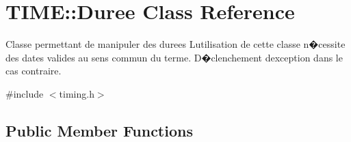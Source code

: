 \hypertarget{class_t_i_m_e_1_1_duree}{}\section{T\+I\+M\+E\+:\+:Duree Class Reference}
\label{class_t_i_m_e_1_1_duree}


Classe permettant de manipuler des durees L\textquotesingle{}utilisation de cette classe n�cessite des dates valides au sens commun du terme. D�clenchement d\textquotesingle{}exception dans le cas contraire.  




{\ttfamily \#include $<$timing.\+h$>$}

\subsection*{Public Member Functions}

